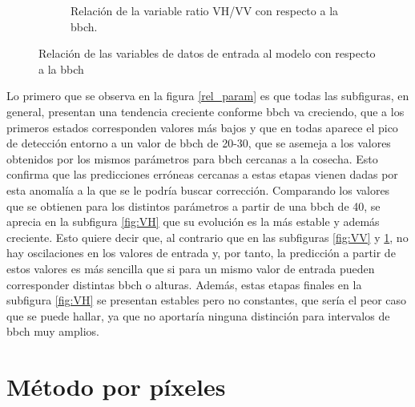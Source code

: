 \begin{figure}[h]
\begin{subfigure}{.45\textwidth}
  \caption{Relación de la variable ratio VH/VV con respecto a la \gls{bbch}.\label{fig:RATIO}}
\end{subfigure}
\caption{Relación de las variables de datos de entrada al modelo con respecto a la \gls{bbch} \label{fig:rel_param}}
\end{figure}

\par Lo primero que se observa en la figura \ref{rel_param} es que todas las subfiguras, en general, presentan una tendencia creciente conforme \gls{bbch} va creciendo, que a los primeros estados corresponden valores más bajos y que en todas aparece el pico de detección entorno a un valor de \gls{bbch} de 20-30, que se asemeja a los valores obtenidos por los mismos parámetros para \gls{bbch} cercanas a la cosecha. Esto confirma que las predicciones erróneas cercanas a estas etapas vienen dadas por esta anomalía a la que se le podría buscar corrección. Comparando los valores que se obtienen para los distintos parámetros a partir de una \gls{bbch} de 40, se aprecia en la subfigura \ref{fig:VH} que su evolución es la más estable y además creciente. Esto quiere decir que, al contrario que en las subfiguras \ref{fig:VV} y \ref{fig:RATIO}, no hay oscilaciones en los valores de entrada y, por tanto, la predicción a partir de estos valores es más sencilla que si para un mismo valor de entrada pueden corresponder distintas \gls{bbch} o alturas. Además, estas etapas finales en la subfigura \ref{fig:VH} se presentan estables pero no constantes, que sería el peor caso que se puede hallar, ya que no aportaría ninguna distinción para intervalos de \gls{bbch} muy amplios. 

\section{Método por píxeles} 
